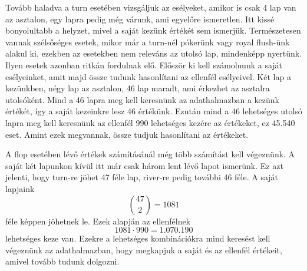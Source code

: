 Tovább haladva a turn esetében vizsgáljuk az esélyeket, amikor is csak 4 lap van az asztalon, egy lapra pedig még várunk, ami egyelőre ismeretlen. Itt kissé bonyolultabb a helyzet, mivel a saját kezünk értékét sem ismerjük. Természetesen vannak szélsőséges esetek, mikor már a turn-nél pókerünk vagy royal flush-ünk alakul ki, ezekben az esetekben nem releváns az utolsó lap, mindenképp nyertünk. Ilyen esetek azonban ritkán fordulnak elő. Először ki kell számolnunk a saját esélyeinket, amit majd össze tudunk hasonlítani az ellenfél esélyeivel. Két lap a kezünkben, négy lap az asztalon, 46 lap maradt, ami érkezhet az asztalra utolsóként. Mind a 46 lapra meg kell keresnünk az adathalmazban a kezünk értékét, így a saját kezeinkre lesz 46 értékünk. Ezután mind a 46 lehetséges utolsó lapra meg kell keresnünk az ellenfél 990 lehetséges kezére az értékeket, ez 45.540 eset. Amint ezek megvannak, össze tudjuk hasonlítani az értékeket.

A flop esetében lévő értékek számításánál még több számítást kell végeznünk. A saját két lapunkon kívül itt már csak három lent lévő lapot ismerünk. Ez azt jelenti, hogy turn-re jöhet 47 féle lap, river-re pedig további 46 féle. A saját lapjaink \[ \binom{47}{2}=1081\] féle képpen jöhetnek le. Ezek alapján az ellenfélnek \[1081\cdot990=1.070.190\] lehetséges keze van. Ezekre a lehetséges kombinációkra mind keresést kell végeznünk az adathalmazban, hogy megkapjuk a saját és az ellenfél értékeit, amivel tovább tudunk dolgozni.

